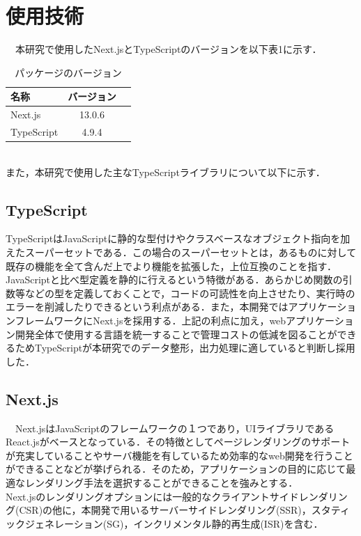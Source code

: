 \section{使用技術}
　本研究で使用したNext.jsとTypeScriptのバージョンを以下表1に示す．\\
 \begin{table}[ht]
   \centering
   \caption{パッケージのバージョン}
   \begin{tabular}{lcr}
      \hline
		名称         & バージョン   \\
		\hline \hline
		Next.js    & 13.0.6  \\
		TypeScript & 4.9.4   \\
		
		\hline
   \end{tabular}
 \end{table}\\
 また，本研究で使用した主なTypeScriptライブラリについて以下に示す．
 \subsection{TypeScript}
 TypeScriptはJavaScriptに静的な型付けやクラスベースなオブジェクト指向を加えたスーパーセットである．この場合のスーパーセットとは，あるものに対して既存の機能を全て含んだ上でより機能を拡張した，上位互換のことを指す．JavaScriptと比べ型定義を静的に行えるという特徴がある．あらかじめ関数の引数等などの型を定義しておくことで，コードの可読性を向上させたり、実行時のエラーを削減したりできるという利点がある．また，本開発ではアプリケーションフレームワークにNext.jsを採用する．上記の利点に加え，webアプリケーション開発全体で使用する言語を統一することで管理コストの低減を図ることができるためTypeScriptが本研究でのデータ整形，出力処理に適していると判断し採用した．

\subsection{Next.js}
　Next.jsはJavaScriptのフレームワークの１つであり，UIライブラリであるReact.jsがベースとなっている．その特徴としてページレンダリングのサポートが充実していることやサーバ機能を有しているため効率的なweb開発を行うことができることなどが挙げられる．そのため，アプリケーションの目的に応じて最適なレンダリング手法を選択することができることを強みとする．\\
 Next.jsのレンダリングオプションには一般的なクライアントサイドレンダリング(CSR)の他に，本開発で用いるサーバーサイドレンダリング(SSR)，スタティックジェネレーション(SG)，インクリメンタル静的再生成(ISR)を含む．

